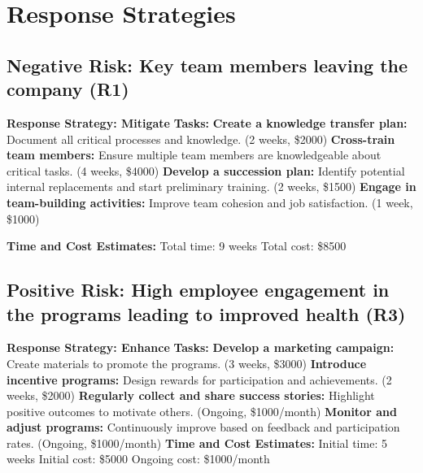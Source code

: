 \section*{Response Strategies}

\subsection*{Negative Risk: Key team members leaving the company (R1)} 
\begin{outline}
    \1 \textbf{Response Strategy: Mitigate}
        \2 \textbf{Tasks:}
            \3 \textbf{Create a knowledge transfer plan:} Document all critical processes and knowledge. (2 weeks, \$2000)
            \3 \textbf{Cross-train team members:} Ensure multiple team members are knowledgeable about critical tasks. (4 weeks, \$4000)
            \3 \textbf{Develop a succession plan:} Identify potential internal replacements and start preliminary training. (2 weeks, \$1500)
            \3 \textbf{Engage in team-building activities:} Improve team cohesion and job satisfaction. (1 week, \$1000)
\end{outline}
\begin{outline}
    \1 \textbf{Time and Cost Estimates:} 
        \2 Total time: 9 weeks 
        \2 Total cost: \$8500
\end{outline}
\pagebreak
\subsection*{Positive Risk: High employee engagement in the programs leading to improved health (R3)}
\begin{outline}
    \1 \textbf{Response Strategy: Enhance} 
        \2 \textbf{Tasks:}
            \3 \textbf{Develop a marketing campaign:} Create materials to promote the programs. (3 weeks, \$3000)
            \3 \textbf{Introduce incentive programs:} Design rewards for participation and achievements. (2 weeks, \$2000)
            \3 \textbf{Regularly collect and share success stories:} Highlight positive outcomes to motivate others. (Ongoing, \$1000/month)
            \3 \textbf{Monitor and adjust programs:} Continuously improve based on feedback and participation rates. (Ongoing, \$1000/month)
    \1 \textbf{Time and Cost Estimates:} 
        \2 Initial time: 5 weeks 
        \2 Initial cost: \$5000 
        \2 Ongoing cost: \$1000/month

\end{outline}



\FloatBarrier
\newpage